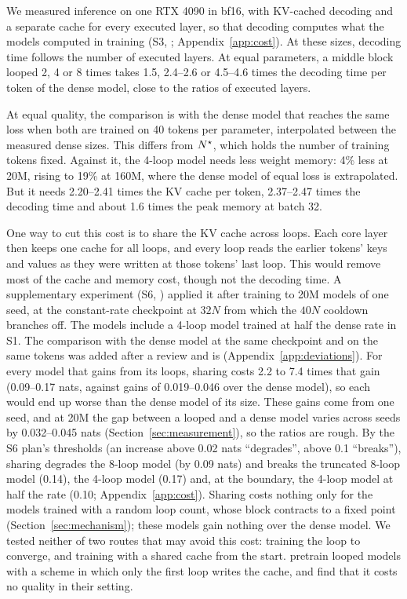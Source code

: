 We measured inference on one RTX 4090 in bf16, with KV-cached decoding and a separate cache for every executed layer, so that decoding computes what the models
computed in training (S3, ; Appendix~\ref{app:cost}). At these sizes, decoding time follows
the number of executed layers. At equal parameters, a middle block looped 2, 4 or 8 times takes 1.5, 2.4--2.6 or
4.5--4.6 times the decoding time per token of the dense model, close to the ratios of executed layers.

At equal quality, the comparison is with the dense model that reaches the same loss when both are trained on 40
tokens per parameter, interpolated between the measured dense sizes. This differs from $N^{\star}$, which holds the number
of training tokens fixed. Against it, the 4-loop
model needs less weight memory: 4\% less at 20M, rising to 19\% at 160M, where the dense model of equal loss is
extrapolated. But it needs 2.20--2.41 times the KV cache per token, 2.37--2.47 times the decoding time and about 1.6
times the peak memory at batch 32.

One way to cut this cost is to share the KV cache across loops. Each core layer then keeps one cache for all loops,
and every loop reads the earlier tokens' keys and values as they were written at those tokens' last loop. This would
remove most of the cache and memory cost, though not the decoding time. A supplementary experiment (S6, ) applied it after
training to 20M models of one seed, at the constant-rate checkpoint at $32N$ from which the $40N$ cooldown branches
off. The models include a 4-loop model trained at half the dense rate in S1. The comparison with the dense model at
the same checkpoint and on the same tokens was added after a review and is 
(Appendix~\ref{app:deviations}). For every model that gains
from its loops, sharing costs 2.2 to 7.4 times that gain (0.09--0.17 nats, against gains of 0.019--0.046 over the dense
model), so each would end up worse than the dense model of its size. These gains come from one seed, and at 20M the
gap between a looped and a dense model varies across seeds by 0.032--0.045 nats (Section~\ref{sec:measurement}), so
the ratios are rough. By the S6 plan's thresholds (an increase above 0.02 nats ``degrades'', above 0.1
``breaks''), sharing degrades the 8-loop model (by
0.09 nats) and breaks the truncated 8-loop model (0.14), the 4-loop model (0.17) and, at the boundary, the 4-loop
model at half the rate (0.10; Appendix~\ref{app:cost}). Sharing costs nothing only for the models trained with a random loop count, whose block
contracts to a fixed point (Section~\ref{sec:mechanism}); these models gain nothing over the dense model. We tested neither of two routes that may avoid this cost: training the loop to converge, and
training with a shared cache from the start. \citet{monea2026shared} pretrain looped models with a scheme in which only the first loop
writes the cache, and find that it costs no quality in their setting.

